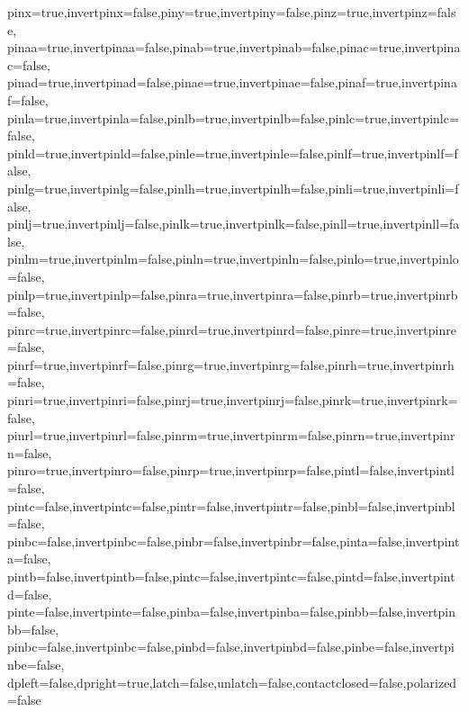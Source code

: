 {  pinx=true,invertpinx=false,piny=true,invertpiny=false,pinz=true,invertpinz=false,
  pinaa=true,invertpinaa=false,pinab=true,invertpinab=false,pinac=true,invertpinac=false,
  pinad=true,invertpinad=false,pinae=true,invertpinae=false,pinaf=true,invertpinaf=false,
  pinla=true,invertpinla=false,pinlb=true,invertpinlb=false,pinlc=true,invertpinlc=false,
  pinld=true,invertpinld=false,pinle=true,invertpinle=false,pinlf=true,invertpinlf=false,
  pinlg=true,invertpinlg=false,pinlh=true,invertpinlh=false,pinli=true,invertpinli=false,
  pinlj=true,invertpinlj=false,pinlk=true,invertpinlk=false,pinll=true,invertpinll=false,
  pinlm=true,invertpinlm=false,pinln=true,invertpinln=false,pinlo=true,invertpinlo=false,
  pinlp=true,invertpinlp=false,pinra=true,invertpinra=false,pinrb=true,invertpinrb=false,
  pinrc=true,invertpinrc=false,pinrd=true,invertpinrd=false,pinre=true,invertpinre=false,
  pinrf=true,invertpinrf=false,pinrg=true,invertpinrg=false,pinrh=true,invertpinrh=false,
  pinri=true,invertpinri=false,pinrj=true,invertpinrj=false,pinrk=true,invertpinrk=false,
  pinrl=true,invertpinrl=false,pinrm=true,invertpinrm=false,pinrn=true,invertpinrn=false,
  pinro=true,invertpinro=false,pinrp=true,invertpinrp=false,pintl=false,invertpintl=false,
  pintc=false,invertpintc=false,pintr=false,invertpintr=false,pinbl=false,invertpinbl=false,
  pinbc=false,invertpinbc=false,pinbr=false,invertpinbr=false,pinta=false,invertpinta=false,
  pintb=false,invertpintb=false,pintc=false,invertpintc=false,pintd=false,invertpintd=false,
  pinte=false,invertpinte=false,pinba=false,invertpinba=false,pinbb=false,invertpinbb=false,
  pinbc=false,invertpinbc=false,pinbd=false,invertpinbd=false,pinbe=false,invertpinbe=false,
  dpleft=false,dpright=true,latch=false,unlatch=false,contactclosed=false,polarized=false
}%

